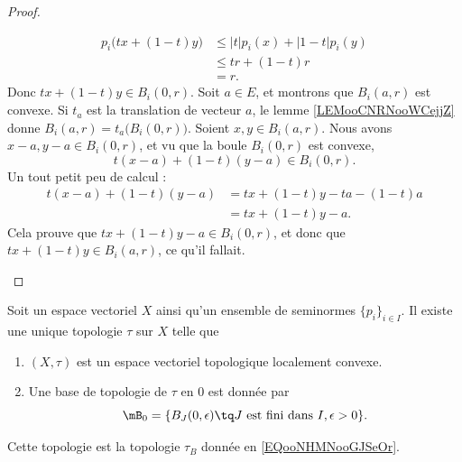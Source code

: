 \begin{proof}
\begin{subproof}
\begin{subequations}
\begin{align}
				p_i\big( tx+(1-t)y \big) & \leq | t |p_i(x)+| 1-t |p_i(y) \\
				                         & \leq tr+(1-t)r                 \\
				                         & =r.
			\end{align}
		\end{subequations}
		Donc \( tx+(1-t)y\in B_i(0,r)\).
		Soit \( a\in E\), et montrons que \( B_i(a,r)\) est convexe. Si \( t_a\) est la translation de vecteur \( a\), le lemme \ref{LEMooCNRNooWCejjZ} donne \( B_i(a,r)=t_a\big( B_i(0,r) \big)\). Soient \( x,y\in B_i(a,r)\). Nous avons \( x-a,y-a\in B_i(0,r)\), et vu que la boule \( B_i(0,r)\) est convexe,
		\begin{equation}
			t(x-a)+(1-t)(y-a)\in B_i(0,r).
		\end{equation}
		Un tout petit peu de calcul :
		\begin{subequations}
			\begin{align}
				t(x-a)+(1-t)(y-a) & =tx+(1-t)y-ta-(1-t)a \\
				                  & =tx+(1-t)y-a.
			\end{align}
		\end{subequations}
		Cela prouve que \( tx+(1-t)y-a\in B_i(0,r)\), et donc que \( tx+(1-t)y\in B_i(a,r)\), ce qu'il fallait.
	\end{subproof}
\end{proof}

\begin{proposition}		\label{PROPooNAFAooShzixo}
	Soit un espace vectoriel \( X\) ainsi qu'un ensemble de seminormes \( \{ p_i \}_{i\in I}\). Il existe une unique topologie \( \tau\) sur \( X\) telle que
	\begin{enumerate}
		\item
		      \( (X,\tau)\) est un espace vectoriel topologique localement convexe.
		\item
		      Une base de topologie de \( \tau\) en \( 0\) est donnée par
		      \begin{equation}
			      \mB_0=\{   B_J(0,\epsilon)\tq \text{\( J\) est fini dans \( I\)}, \epsilon>0   \}.
		      \end{equation}
	\end{enumerate}
	Cette topologie est la topologie \( \tau_B\) donnée en \eqref{EQooNHMNooGJSeOr}.
\end{proposition}

